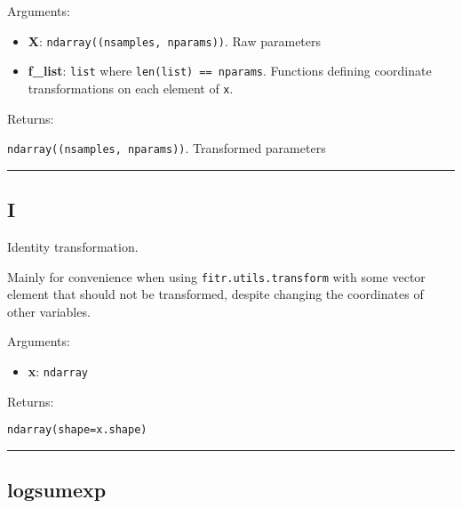 Arguments:

\begin{itemize}
\tightlist
\item
  \textbf{X}: \texttt{ndarray((nsamples,\ nparams))}. Raw parameters
\item
  \textbf{f\_list}: \texttt{list} where \texttt{len(list)\ ==\ nparams}.
  Functions defining coordinate transformations on each element of
  \texttt{x}.
\end{itemize}

Returns:

\texttt{ndarray((nsamples,\ nparams))}. Transformed parameters

\begin{center}\rule{0.5\linewidth}{\linethickness}\end{center}

\subsection{I}\label{i}

\begin{Shaded}
\begin{Highlighting}[]
\end{Highlighting}
\end{Shaded}

Identity transformation.

Mainly for convenience when using \texttt{fitr.utils.transform} with
some vector element that should not be transformed, despite changing the
coordinates of other variables.

Arguments:

\begin{itemize}
\tightlist
\item
  \textbf{x}: \texttt{ndarray}
\end{itemize}

Returns:

\texttt{ndarray(shape=x.shape)}

\begin{center}\rule{0.5\linewidth}{\linethickness}\end{center}

\subsection{logsumexp}\label{logsumexp}

\begin{Shaded}
\begin{Highlighting}[]
\end{Highlighting}
\end{Shaded}

